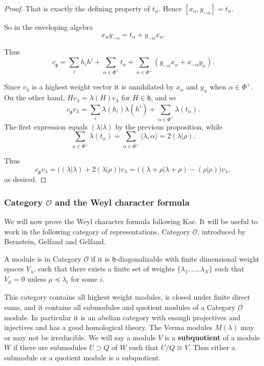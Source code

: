 \documentclass[12pt]{article}
\begin{document}
\begin{proof}
    That is exactly the defining property of $t_\alpha$. Hence
    $[x_\alpha,y_{-\alpha}] = t_\alpha$.

    So in the enveloping algebra
    \[
        x_\alpha y_{-\alpha} = t_\alpha + y_{-\alpha}x_\alpha.
    \]

    Thus
    \[
        c_{\mathfrak{g}} = \sum_i h_i h^i + \sum_{\alpha \in \Phi^+} t_\alpha
        + \sum_{\alpha \in \Phi^+} (y_{-\alpha}x_\alpha + x_{-\alpha}y_\alpha).
    \]

    Since $v_\lambda$ is a highest weight vector it is annihilated by $x_\alpha$ and $y_\alpha$
    when $\alpha \in \Phi^+$. On the other hand,
    $Hv_\lambda = \lambda(H)v_\lambda$ for $H \in \mathfrak{h}$, and so
    \[
        c_{\mathfrak{g}} v_\lambda
        = \sum_i \lambda(h_i)\lambda(h^i) + \sum_{\alpha \in \Phi^+} \lambda(t_\alpha).
    \]
    The first expression equals $(\lambda|\lambda)$ by the previous proposition, while
    \[
        \sum_{\alpha \in \Phi^+} \lambda(t_\alpha)
        = \sum_{\alpha \in \Phi^+} \langle \lambda, \alpha \rangle
        = 2(\lambda|\rho).
    \]

    Thus
    \[
        c_{\mathfrak{g}} v_\lambda
        = \big( (\lambda|\lambda) + 2(\lambda|\rho)\big) v_\lambda
        = \big( (\lambda+\rho|\lambda+\rho) - (\rho|\rho)\big)v_\lambda,
    \]
    as desired.
\end{proof}

\subsubsection{Category $\mathcal{O}$ and the Weyl character formula}
We will now prove the Weyl character formula following Kac. It will be useful to work in the following category of representations, Category $\mathcal{O}$, introduced by Bernstein, Gelfand and Gelfand.

\begin{definition}
    A module is in Category $\mathcal{O}$ if it is $\mathfrak{h}$-diagonalizable with finite dimensional weight spaces $V_\lambda$, such that there exists a finite set of weights $\{\lambda_1,\dots,\lambda_N\}$ such that $V_\mu = 0$ unless $\mu \preceq \lambda_i$ for some $i$.
\end{definition}

This category contains all highest weight modules, is closed under finite direct sums, and it contains all submodules and quotient modules of a Category $\mathcal{O}$ module. In particular it is an abelian category with enough projectives and injectives and has a good homological theory. The Verma modules $M(\lambda)$ may or may not be irreducible. We will say a module $V$ is a \textbf{subquotient} of a module $W$ if there are submodules $U \supset Q$ of $W$ such that $U/Q \cong V$. Thus either a submodule or a quotient module is a subquotient.
\end{document}
